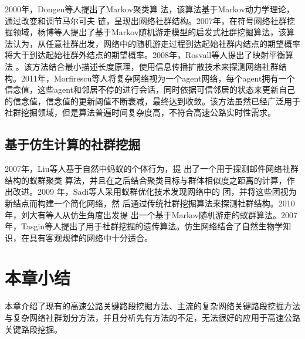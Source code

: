 2000年，Dongen等人提出了Markov聚类算
法\parencite{Dongen2000Graph}，该算法基于Markov动力学理论，通过改变和调节马尔可夫
链，呈现出网络社群结构。2007年，在符号网络社群挖掘领域，杨博等人提出了基于Markov随机游走模型的启发式社群挖掘算法\parencite{jd2012fz}，该算法认为，从任意社群出发，网络中的随机游走过程到达起始社群内结点的期望概率将大于到达起始社群外结点的期望概率。2008年，Rosvall等人提出了映射平衡算法
\parencite{Rosvall2008Maps}。该方法结合最小描述长度原理，使用信息传播扩散技术来探测网络社群结构。2011年，Morfirescu等人将复杂网络视为一个agent网络\parencite{Mor2009Opinion}，每个agent拥有一个信念值，这些agent和邻居不停的进行会话，同时依据可信邻居的状态来更新自己的信念值，信念值的更新阈值不断衰减，最终达到收敛。该方法虽然已经广泛用于社群挖掘领域，但是算法普遍时间复杂度高，不符合高速公路实时性需求。

\subsection{基于仿生计算的社群挖掘}

2007年，Liu等人基于自然中蚂蚁的个体行为，提
出了一个用于探测邮件网络社群结构的蚁群聚类
算法\parencite{Liu2007Email}，并且在之后结合聚类目标与群体相似度之距离的计算，作出改进。2009
年，Sadi等人采用蚁群优化技术发现网络中的
团，并将这些团视为新结点而构建一个简化网络，然
后通过传统社群挖掘算法来探测社群结构\parencite{Liu2010Finding}。2010年，刘大有等人从仿生角度出发提
出一个基于Markov随机游走的蚁群算法\parencite{Di2012Ant}。2007年，Tasgin等人提出了用于社群挖掘的遗传算法\parencite{Tasgin2007Community}。仿生网络结合了自然生物学知识，在具有客观规律的网络中十分适合。

\section{本章小结}
本章介绍了现有的高速公路关键路段挖掘方法、主流的复杂网络关键路段挖掘方法与复杂网络社群划分方法，并且分析先有方法的不足，无法很好的应用于高速公路关键路段挖掘。
			